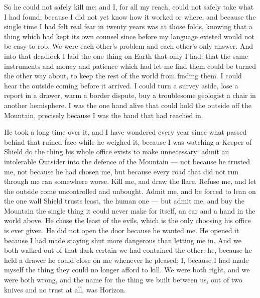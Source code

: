 So he could not safely kill me; and I, for all my reach, could not safely take what I had found, because I did not yet know how it worked or where, and because the single time I had felt real fear in twenty years was at those folds, knowing that a thing which had kept its own counsel since before my language existed would not be easy to rob. We were each other's problem and each other's only answer. And into that deadlock I laid the one thing on Earth that only I had: that the same instruments and money and patience which had let me find them could be turned the other way about, to keep the rest of the world from finding them. I could hear the outside coming before it arrived. I could turn a survey aside, lose a report in a drawer, warm a border dispute, buy a troublesome geologist a chair in another hemisphere. I was the one hand alive that could hold the outside off the Mountain, precisely because I was the hand that had reached in.\par

He took a long time over it, and I have wondered every year since what passed behind that ruined face while he weighed it, because I was watching a Keeper of Shield do the thing his whole office exists to make unnecessary: admit an intolerable Outsider into the defence of the Mountain --- not because he trusted me, not because he had chosen me, but because every road that did not run through me ran somewhere worse. Kill me, and draw the flare. Refuse me, and let the outside come uncontrolled and unbought. Admit me, and be forced to lean on the one wall Shield trusts least, the human one --- but admit me, and buy the Mountain the single thing it could never make for itself, an ear and a hand in the world above. He chose the least of the evils, which is the only choosing his office is ever given. He did not open the door because he wanted me. He opened it because I had made staying shut more dangerous than letting me in. And we both walked out of that dark certain we had contained the other: he, because he held a drawer he could close on me whenever he pleased; I, because I had made myself the thing they could no longer afford to kill. We were both right, and we were both wrong, and the name for the thing we built between us, out of two knives and no trust at all, was Horizon.\par

